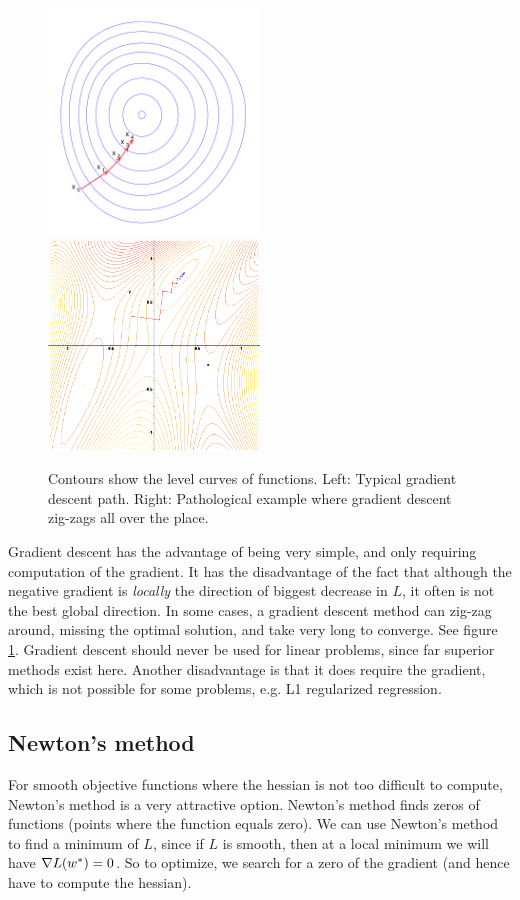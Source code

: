 \begin{figure}
  \label{logistic:figure:grad-desc}
  \includegraphics[width=0.5\textwidth]{../images/Gradient_descent}
  \includegraphics[width=0.5\textwidth]{../images/Gradient_descent_pathological}
  \caption{Contours show the level curves of functions.  Left:  Typical gradient descent path.  Right:  Pathological example where gradient descent zig-zags all over the place.}
\end{figure}
Gradient descent has the advantage of being very simple, and only requiring computation of the gradient.  It has the disadvantage of the fact that although the negative gradient is \emph{locally} the direction of biggest decrease in $L$, it often is not the best global direction.  In some cases, a gradient descent method can zig-zag around, missing the optimal solution, and take very long to converge.  See figure \ref{logistic:figure:grad-desc}.  Gradient descent should never be used for linear problems, since far superior methods exist here.  Another disadvantage is that it does require the gradient, which is not possible for some problems, e.g. L1 regularized regression.

\subsection{Newton's method}
For smooth objective functions where the hessian is not too difficult to compute, Newton's method is a very attractive option.  Newton's method finds zeros of functions (points where the function equals zero).   We can use Newton's method to find a minimum of $L$, since if $L$ is smooth, then at a local minimum we will have $\nabla L({w^\ast})=0$.  So to optimize, we search for a zero of the gradient (and hence have to compute the hessian).  

